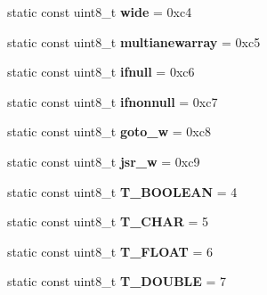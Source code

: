 \begin{DoxyCompactItemize}
\item 
static const uint8\+\_\+t {\bfseries wide} = 0xc4\hypertarget{classInstruction_aec0961cb33b8f0db4dc423e4709f03f8}{}\label{classInstruction_aec0961cb33b8f0db4dc423e4709f03f8}

\item 
static const uint8\+\_\+t {\bfseries multianewarray} = 0xc5\hypertarget{classInstruction_a43b0db7fa0d9ba1ec5f899b078428124}{}\label{classInstruction_a43b0db7fa0d9ba1ec5f899b078428124}

\item 
static const uint8\+\_\+t {\bfseries ifnull} = 0xc6\hypertarget{classInstruction_aa464d5c43b5cd5b547e51c1e7b463507}{}\label{classInstruction_aa464d5c43b5cd5b547e51c1e7b463507}

\item 
static const uint8\+\_\+t {\bfseries ifnonnull} = 0xc7\hypertarget{classInstruction_ad4ad0abd99c2dd68e069883fdb49528c}{}\label{classInstruction_ad4ad0abd99c2dd68e069883fdb49528c}

\item 
static const uint8\+\_\+t {\bfseries goto\+\_\+w} = 0xc8\hypertarget{classInstruction_aa7c6cf404f82d6712b6c930a30432fce}{}\label{classInstruction_aa7c6cf404f82d6712b6c930a30432fce}

\item 
static const uint8\+\_\+t {\bfseries jsr\+\_\+w} = 0xc9\hypertarget{classInstruction_affa5a37938f460e321c2fb8263958caa}{}\label{classInstruction_affa5a37938f460e321c2fb8263958caa}

\item 
static const uint8\+\_\+t {\bfseries T\+\_\+\+B\+O\+O\+L\+E\+AN} = 4\hypertarget{classInstruction_a8231913318faaf146f32c811ad64020d}{}\label{classInstruction_a8231913318faaf146f32c811ad64020d}

\item 
static const uint8\+\_\+t {\bfseries T\+\_\+\+C\+H\+AR} = 5\hypertarget{classInstruction_a4f37432f1448d1a7de48888d85b3bdcf}{}\label{classInstruction_a4f37432f1448d1a7de48888d85b3bdcf}

\item 
static const uint8\+\_\+t {\bfseries T\+\_\+\+F\+L\+O\+AT} = 6\hypertarget{classInstruction_abe069e002360f0e99aa71cb5056901a0}{}\label{classInstruction_abe069e002360f0e99aa71cb5056901a0}

\item 
static const uint8\+\_\+t {\bfseries T\+\_\+\+D\+O\+U\+B\+LE} = 7\hypertarget{classInstruction_a839a5e51d139789948e94933d35293b3}{}\label{classInstruction_a839a5e51d139789948e94933d35293b3}


\end{DoxyCompactItemize}
